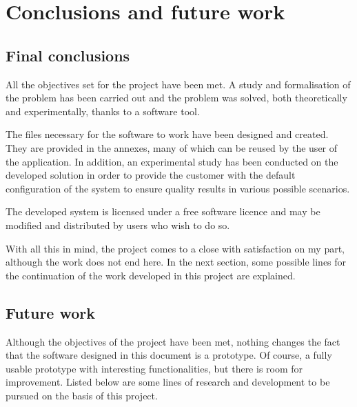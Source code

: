 \renewcommand{\documentname}{Conclusions and future work}

\chapter{Conclusions and future work}

\section{Final conclusions}

All the objectives set for the project have been met. A study and formalisation of the problem has been carried out and the problem was solved, both theoretically and experimentally, thanks to a software tool.

The files necessary for the software to work have been designed and created. They are provided in the annexes, many of which can be reused by the user of the application. In addition, an experimental study has been conducted on the developed solution in order to provide the customer with the default configuration of the system to ensure quality results in various possible scenarios.

The developed system is licensed under a free software licence and may be modified and distributed by users who wish to do so.

With all this in mind, the project comes to a close with satisfaction on my part, although the work does not end here. In the next section, some possible lines for the continuation of the work developed in this project are explained.


\section{Future work}

Although the objectives of the project have been met, nothing changes the fact that the software designed in this document is a prototype. Of course, a fully usable prototype with interesting functionalities, but there is room for improvement. Listed below are some lines of research and development to be pursued on the basis of this project.


